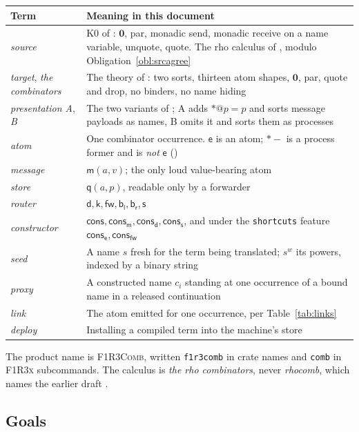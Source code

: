 \documentclass[11pt,a4paper]{article}
\makeatletter
\newcommand{\code}[1]{\texttt{#1}}
\newcommand{\Comb}{\textsc{F1R3Comb}}
\newcommand{\Fx}{\textsc{F1R3x}}
\newcommand{\quo}[1]{@#1}
\newcommand{\drp}[1]{{*}#1}
\newcommand{\nil}{\mathbf{0}}
\newcommand{\mm}{\mathsf{m}}
\newcommand{\dd}{\mathsf{d}}
\newcommand{\kk}{\mathsf{k}}
\newcommand{\fw}{\mathsf{fw}}
\newcommand{\bl}{\mathsf{b}_{\mathsf{l}}}
\newcommand{\br}{\mathsf{b}_{\mathsf{r}}}
\newcommand{\sy}{\mathsf{s}}
\newcommand{\ev}{\mathsf{e}}
\newcommand{\qq}{\mathsf{q}}
\newcommand{\cons}{\mathsf{cons}}
\theoremstyle{definition}
\theoremstyle{plain}
\makeatother
\begin{document}
\begin{center}
\begin{tabularx}{\linewidth}{@{}l>{\raggedright\arraybackslash}X@{}}
\toprule
Term & Meaning in this document\\
\midrule
\emph{source} & K0 of \cite{k1ndl1ng}: $\nil$, par, monadic send, monadic
receive on a name variable, unquote, quote. The rho calculus of
\cite[\S2]{draft3}, modulo Obligation~\ref{obl:srcagree}\\
\emph{target}, \emph{the combinators} & The theory of \cite[\S3]{draft3}:
two sorts, thirteen atom shapes, $\nil$, par, quote and drop, no binders, no
name hiding\\
\emph{presentation A}, \emph{B} & The two variants of \cite[\S3.3]{draft3};
A adds $\drp{\quo{p}} = p$ and sorts message payloads as names, B omits it
and sorts them as processes\\
\emph{atom} & One combinator occurrence. $\ev$ is an atom; $\drp{-}$ is a
process former and is \emph{not} $\ev$ (\cite[\S3.2]{draft3})\\
\emph{message} & $\mm(a,v)$; the only loud value-bearing atom\\
\emph{store} & $\qq(a,p)$, readable only by a forwarder\\
\emph{router} & $\dd,\kk,\fw,\bl,\br,\sy$\\
\emph{constructor} & $\cons,\cons_{\mm},\cons_{\dd},\cons_{\sy}$, and under
the \code{shortcuts} feature $\cons_{\ev},\cons_{\fw}$\\
\emph{seed} & A name $s$ fresh for the term being translated; $s^{w}$ its
powers, indexed by a binary string\\
\emph{proxy} & A constructed name $c_{i}$ standing at one occurrence of a
bound name in a released continuation\\
\emph{link} & The atom emitted for one occurrence, per Table~\ref{tab:links}\\
\emph{deploy} & Installing a compiled term into the machine's store\\
\bottomrule
\end{tabularx}
\end{center}

\noindent
The product name is \Comb, written \code{f1r3comb} in crate names and
\code{comb} in \Fx{} subcommands. The calculus is \emph{the rho combinators},
never \emph{rhocomb}, which names the earlier draft \cite{rhocomb}.

\subsection{Goals}
\end{document}
